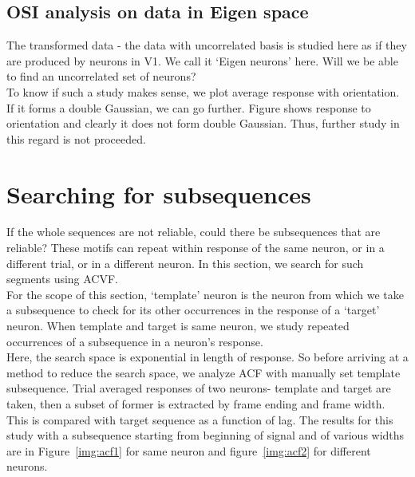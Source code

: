 \documentclass[11pt,paper=a4,answers]{exam}
\begin{document}
\subsection{OSI analysis on data in Eigen space} %
\label{sub:osi_analysis_on_data_in_eigen_space}
The transformed data - the data with uncorrelated basis is studied here as if they are produced by neurons in V1. We call it `Eigen neurons' here. Will we be able to find an uncorrelated set of neurons?\\
To know if such a study makes sense, we plot average response with orientation. If it forms a double Gaussian,  we can go further. Figure shows response to orientation and clearly it does not form double Gaussian. Thus, further study in this regard is not proceeded.



\section{Searching for subsequences} %
\label{sec:searching_for_motifs}
If the whole sequences are not reliable, could there be subsequences that are reliable? These motifs can repeat within response of the same neuron, or in a different trial, or in a different neuron. In this section, we search for such segments using ACVF.\\
For the scope of this section, `template' neuron is the neuron from which we take a subsequence to check for its other occurrences in the response of a `target' neuron.
When template and target is same neuron, we study repeated occurrences of a subsequence in a neuron's response.\\
Here, the search space is exponential in length of response. So before arriving at a method to reduce the search space, we analyze ACF with manually set template subsequence. Trial averaged responses of two neurons- template and target are taken, then a subset of former is extracted by frame ending and frame width. This is compared with target sequence as a function of lag. The results for this study with a subsequence starting from beginning of signal and of various widths are in Figure~\ref{img:acf1} for same neuron and figure~\ref{img:acf2} for different neurons.
\end{document}
